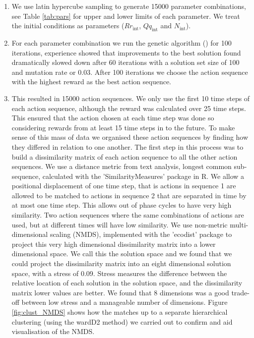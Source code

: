 \documentclass[12pt, a4paper]{article}
\begin{document}
\begin{enumerate}
\item We use latin hypercube sampling to generate 15000 parameter combinations, see Table \ref{tab:pars} for upper and lower limits of each parameter. We treat the initial conditions as parameters ($Rr_\text{int}$, $Qq_\text{int}$ and $N_\text{int}$). 
\item For each parameter combination we run the genetic algorithm () for 100 iterations, experience showed that improvements to the best solution found dramatically slowed down after 60 iterations with a solution set size of 100 and mutation rate or 0.03. After 100 iterations we choose the action sequence with the highest reward as the best action sequence.     
\item This resulted in 15000 action sequences. We only use the first 10 time steps of each action sequence, although the reward was calculated over 25 time steps. This ensured that the action chosen at each time step was done so considering rewards from at least 15 time steps in to the future. To make sense of this mass of data we organised these action sequences by finding how they differed in relation to one another. The first step in this process was to build a dissimilarity matrix of each action sequence to all the other action sequences. We use a distance metric from text analysis, longest common sub-sequence, calculated with the 'SimilarityMeasures' \citep{Tooh2015} package in R. We allow a positional displacement of one time step, that is actions in sequence 1 are allowed to be matched to actions in sequence 2 that are separated in time by at most one time step. This allows out of phase cycles to have very high similarity. Two action sequences where the same combinations of actions are used, but at different times will have low similarity. We use non-metric multi-dimensional scaling (NMDS), implemented with the 'ecodist' package \citep{Gosl2007} to project this very high dimensional dissimilarity matrix into a lower dimensional space. We call this the solution space and we found that we could project the dissimilarity matrix into an eight dimensional solution space, with a stress of 0.09. Stress measures the difference between the relative location of each solution in the solution space, and the dissimilarity matrix lower values are better. We found that 8 dimensions was a good trade-off between low stress and a manageable number of dimensions. Figure \ref{fig:clust_NMDS} shows how the matches up to a separate hierarchical clustering (using the wardD2 method) we carried out to confirm and aid visualisation of the NMDS.                  

\end{enumerate}
\end{document}
